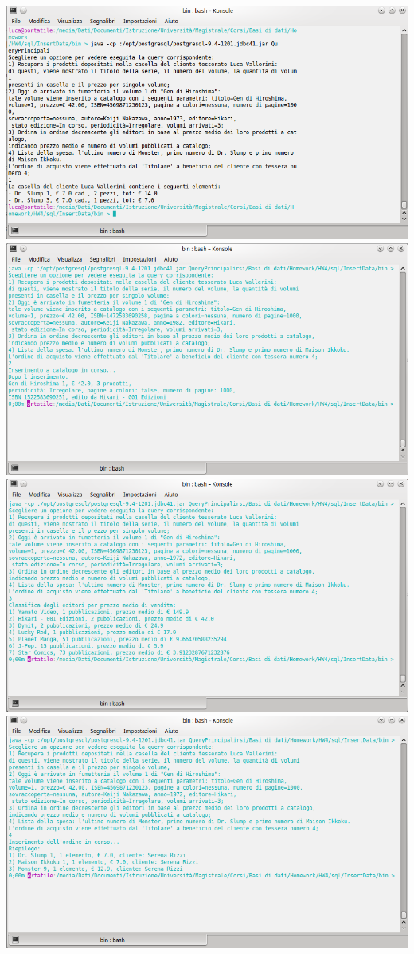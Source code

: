 \documentclass[a4paper]{scrartcl}
\begin{document}
\includegraphics[width=\linewidth]{img/query1_1}
\includegraphics[width=\linewidth]{img/query2_1}
\includegraphics[width=\linewidth]{img/query3_1}
\includegraphics[width=\linewidth]{img/query4_1}
\end{document}
